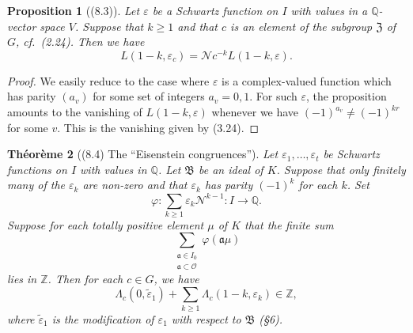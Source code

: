 \documentclass[12pt,a4paper]{article}
\theoremstyle{plain}
\newtheorem{theorem}{Th\'{e}or\`{e}me}[section]
\newtheorem{proposition}[theorem]{Proposition}
\theoremstyle{definition}
\theoremstyle{remark}
\begin{document}
\begin{proposition}[(8.3)]\label{prop:8.3}
Let $\varepsilon$ be a Schwartz function on $I$ with values in a $\mathbb{Q}$-vector space $V$. Suppose that $k \ge 1$ and that $c$ is an element of the subgroup $\mathfrak{Z}$ of $G$, cf.~(2.24). Then we have
\[
L(1-k, \varepsilon_c) = \mathcal{N}c^{-k} L(1-k, \varepsilon).
\]
\end{proposition}

\begin{proof}
We easily reduce to the case where $\varepsilon$ is a complex-valued function which has parity $(a_v)$ for some set of integers $a_v = 0, 1$. For such $\varepsilon$, the proposition amounts to the vanishing of $L(1-k, \varepsilon)$ whenever we have $(-1)^{a_v} \neq (-1)^{kr}$ for some $v$. This is the vanishing given by (3.24).
\end{proof}

\begin{theorem}[(8.4) The ``Eisenstein congruences'']\label{thm:8.4}
Let $\varepsilon_1, \dots, \varepsilon_t$ be Schwartz functions on $I$ with values in $\mathbb{Q}$. Let $\mathfrak{B}$ be an ideal of $K$. Suppose that only finitely many of the $\varepsilon_k$ are non-zero and that $\varepsilon_k$ has parity $(-1)^k$ for each $k$. Set
\[
\varphi: \sum_{k \ge 1} \varepsilon_k \mathcal{N}^{k-1}: I \to \mathbb{Q}.
\]
Suppose for each totally positive element $\mu$ of $K$ that the finite sum
\[
\sum_{\substack{\mathfrak{a} \in I_0 \\ \mathfrak{a} \subset \mathcal{O}}} \varphi(\mathfrak{a}\mu)
\]
lies in $\mathbb{Z}$. Then for each $c \in G$, we have
\begin{equation}\label{eq:8.5}
\varLambda_c(0, \tilde{\varepsilon}_1) + \sum_{k \ge 1} \varLambda_c(1-k, \varepsilon_k) \in \mathbb{Z},
\end{equation}
where $\tilde{\varepsilon}_1$ is the modification of $\varepsilon_1$ with respect to $\mathfrak{B}$ (\S6).
\end{theorem}
\end{document}
